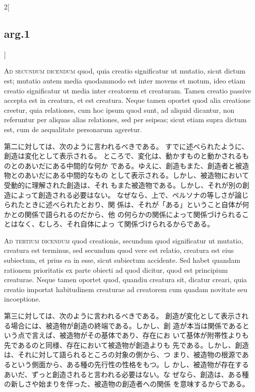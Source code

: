 \documentclass[paper=a4paper,fontsize=10pt,jafontsize=9pt,titlepage]{jlreq}
\begin{document}
\begin{paracol}{2}[\subsection{arg.1}]
\switchcolumn*[\subsection{ad.2}]

{\scshape Ad secundum dicendum} quod, quia creatio significatur ut
 mutatio, sicut dictum est; mutatio autem media quodammodo est inter
 movens et motum, ideo etiam creatio significatur ut media inter
 creatorem et creaturam. Tamen creatio passive accepta est in creatura,
 et est creatura. Neque tamen oportet quod alia creatione creetur, quia
 relationes, cum hoc ipsum quod sunt, ad aliquid dicantur, non
 referuntur per aliquas alias relationes, sed per seipsas; sicut etiam
 supra dictum est, cum de aequalitate personarum ageretur.

\switchcolumn

第二に対しては、次のように言われるべきである。
すでに述べられたように、創造は変化として表示される。
ところで、変化は、動かすものと動かされるものとのあいだにある中間的な何か
 である。ゆえに、創造もまた、創造者と被造物とのあいだにある中間的なもの
 として表示される。しかし、被造物において受動的に理解された創造は、それ
 もまた被造物である。しかし、それが別の創造によって創造される必要はない。
 なぜなら、上で、ペルソナの等しさが論じられたときに述べられたとおり、関
 係は、それが「ある」ということ自体が何かとの関係で語られるのだから、他
 の何らかの関係によって関係づけられることはなく、むしろ、それ自体によっ
 て関係づけられるからである。

\switchcolumn*[\subsection{ad.3}]

{\scshape Ad tertium dicendum} quod creationis, secundum quod significatur ut
 mutatio, creatura est terminus, sed secundum quod vere est relatio,
 creatura est eius subiectum, et prius ea in esse, sicut subiectum
 accidente. Sed habet quandam rationem prioritatis ex parte obiecti ad
 quod dicitur, quod est principium creaturae. Neque tamen oportet quod,
 quandiu creatura sit, dicatur creari, quia creatio importat habitudinem
 creaturae ad creatorem cum quadam novitate seu incoeptione.

\switchcolumn

第三に対しては、次のように言われるべきである。
創造が変化として表示される場合には、被造物が創造の終端である。しかし、創
 造が本当は関係であるという点で言えば、被造物がその基体であり、存在にお
 いて基体が附帯性よりも先であるのと同様、存在において被造物が創造よりも
 先である。しかし、創造は、それに対して語られるところの対象の側から、つ
 まり、被造物の根源であるという側面から、ある種の先行性の性格をもつ。し
 かし、被造物が存在するあいだ、ずっと創造されると言われる必要はない。な
 ぜなら、創造は、ある種の新しさや始まりを伴った、被造物の創造者への関係
 を意味するからである。

\end{paracol}
\newpage
{}
{}
\setcounter{section}{4}
\setcounter{subsection}{0}
\end{document}
